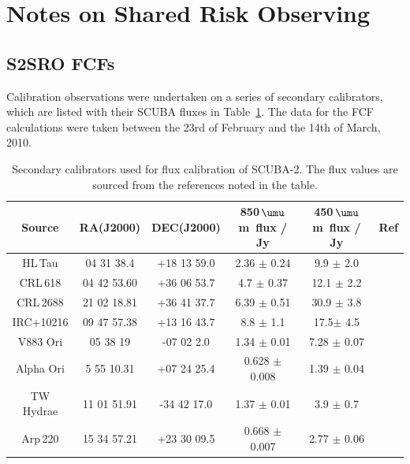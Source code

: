 \documentclass[twoside,11pt]{article}
\newcommand{\micron}{\mbox{\,${\umu}$m}}            %
\renewcommand{\_}{\texttt{\symbol{95}}}
\begin{document}
\newpage
\section{Notes on Shared Risk Observing}

\subsection{S2SRO FCFs}

Calibration observations were undertaken on a series of secondary
calibrators, which are listed with their SCUBA fluxes in
Table~\ref{tab1}. The data for the FCF calculations were taken between
the 23rd of February and the 14th of March, 2010.

\begin{table}[h]
\caption{Secondary calibrators used for flux calibration of SCUBA-2.
  The flux values are sourced from the references noted in the table. }
\label{tab1}
\begin{center}
\begin{tabular}{|c|c|c|c|c|c|}

\hline
\rule[-1ex]{0pt}{3.5ex} Source & RA(J2000) & DEC(J2000) & 850\micron\
flux / Jy & 450\micron\ flux / Jy & Ref  \\
\hline
\rule[-1ex]{0pt}{3.5ex} HL\,Tau & 04 31 38.4 & +18 13 59.0 & 2.36 $\pm$ 0.24     & 9.9 $\pm$ 2.0 & \cite{flux1}\\
\hline
\rule[-1ex]{0pt}{3.5ex} CRL\,618	& 04 42 53.60 & +36 06 53.7 & 4.7  $\pm$ 0.37   & 12.1 $\pm$ 2.2 & \cite{flux1} \\
\hline
\rule[-1ex]{0pt}{3.5ex} CRL\,2688 & 21 02 18.81 & +36 41 37.7 & 6.39  $\pm$ 0.51  & 30.9 $\pm$ 3.8 & \cite{flux1} \\
\hline
\rule[-1ex]{0pt}{3.5ex} IRC+10216 & 09 47 57.38 & +13 16 43.7 & 8.8  $\pm$ 1.1  & 17.5$\pm$ 4.5 & \cite{flux1} \\
\hline
\rule[-1ex]{0pt}{3.5ex} V883 Ori &  05 38 19  & -07 02 2.0 & 1.34 $\pm$ 0.01     & 7.28 $\pm$ 0.07 & \cite{flux2}   \\
\hline
\rule[-1ex]{0pt}{3.5ex} Alpha Ori & 5 55 10.31 & +07 24 25.4 & 0.628 $\pm$ 0.008  & 1.39 $\pm$ 0.04 & \cite{flux2}  \\
\hline
\rule[-1ex]{0pt}{3.5ex} TW Hydrae & 11 01 51.91 & -34 42 17.0 & 1.37 $\pm$ 0.01 & 3.9 $\pm$ 0.7 & \cite{flux2}  \\
\hline
\rule[-1ex]{0pt}{3.5ex} Arp\,220 & 15 34 57.21 & +23 30 09.5 & 0.668 $\pm$ 0.007  & 2.77 $\pm$ 0.06 & \cite{flux2} \\
\hline

\end{tabular}
\end{center}
\end{table}
\end{document}

